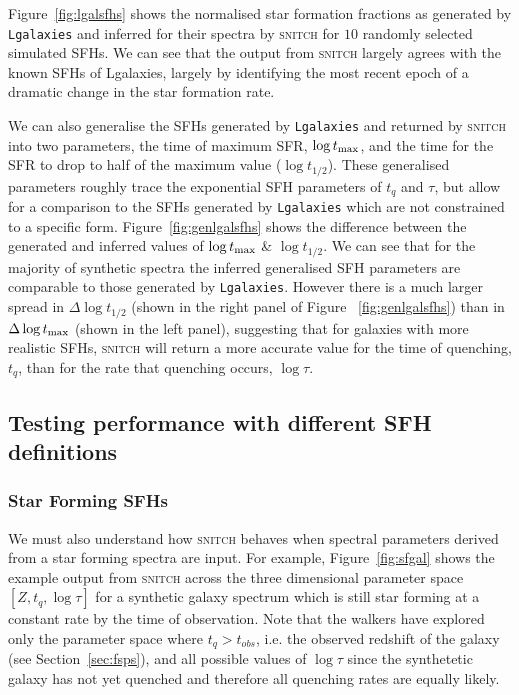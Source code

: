 \documentclass[useAMS,usenatbib]{mn2e}
\begin{document}
Figure~\ref{fig:lgalsfhs} shows the normalised star formation fractions as generated by \texttt{Lgalaxies} and inferred for their spectra by \textsc{snitch} for $10$ randomly selected simulated SFHs. We can see that the output from \textsc{snitch} largely agrees with the known SFHs of Lgalaxies, largely by identifying the most recent epoch of a dramatic change in the star formation rate.

We can also generalise the SFHs generated by \texttt{Lgalaxies} and returned by \textsc{snitch} into two parameters, the time of maximum SFR, $\log t_{\rm{max}}$, and the time for the SFR to drop to half of the maximum value ($\log t_{1/2}$). These generalised parameters roughly trace the exponential SFH parameters of $t_q$ and $\tau$, but allow for a comparison to the SFHs generated by \texttt{Lgalaxies} which are not constrained to a specific form. Figure~\ref{fig:genlgalsfhs} shows the difference between the generated and inferred values of $\log t_{\rm{max}}$ \& $\log t_{1/2}$. We can see that for the majority of synthetic spectra the inferred generalised SFH parameters are comparable to those generated by \texttt{Lgalaxies}. However there is a much larger spread in $\Delta \log t_{1/2}$ (shown in the right panel of Figure ~\ref{fig:genlgalsfhs}) than in $\Delta \log t_{\rm{max}}$ (shown in the left panel), suggesting that for galaxies with more realistic SFHs, \textsc{snitch} will return a more accurate value for the time of quenching, $t_q$, than for the rate that quenching occurs, $\log \tau$.



\subsection{Testing performance with different SFH definitions}\label{sec:diffSFHs}

\subsubsection{Star Forming SFHs}\label{secsec:starforming}

We must also understand how \textsc{snitch} behaves when spectral parameters derived from a star forming spectra are input. For example, Figure~\ref{fig:sfgal} shows the example output from \textsc{snitch} across the three dimensional parameter space $[Z,t_q,\log \tau]$ for a synthetic galaxy spectrum which is still star forming at a constant rate by the time of observation. Note that the walkers have explored only the parameter space where $t_q > t_{obs}$, i.e. the observed redshift of the galaxy (see Section~\ref{sec:fsps}), and all possible values of $\log \tau$ since the synthetetic galaxy has not yet quenched and therefore all quenching rates are equally likely.  
\end{document}

